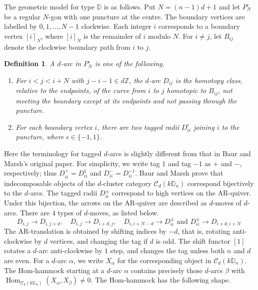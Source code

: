 \documentclass[12pt]{article}
\theoremstyle{plain}
\newtheorem{Def}{Definition}[section]
\theoremstyle{definition}
\DeclareMathOperator{\Hom}{Hom}
\begin{document}
The geometric model for type \(\mathbb D\) is as follows.  Put
\(N=(n-1)d+1\)
and let \(P_N^{\circ}\) be a regular \(N\)-gon with one puncture at the centre.
The boundary vertices are labelled by \(0,1,\ldots,N-1\) clockwise. Each integer $i$ corresponds to a boundary vertex $[i]_N$, where $[i]_N$ is the remainder of $i$ modulo $N$. For $i\neq j$, let \(B_{ij}\) denote the clockwise boundary path from \(i\) to \(j\).

\begin{Def}
A \(d\)-arc in \(P_N^{\circ}\) is one of the following. 
\begin{enumerate}
    \item For $i<j<i+N$ with $j-i-1\in d\mathbb{Z}$, the $d$-arc \(D_{ij}\) is the homotopy class, relative to the
endpoints, of the curve from \(i\) to \(j\) homotopic to \(B_{ij}\), not
meeting the boundary except at its endpoints and not passing through the
puncture.
\item For each boundary vertex \(i\), there are two tagged radii
\(D_{ii}^{\epsilon}\) joining \(i\) to the puncture, where $\epsilon\in\{-1,1\}$.
\end{enumerate}
\end{Def}
Here the terminology for tagged $d$-arcs is slightly different from that in Baur and Marsh's original paper. For simplicity, we write tag $1$ and tag $-1$ as $+$ and $-$, respectively; thus \(D_{ii}^{+}=D_{ii}^{1}\) and \(D_{ii}^{-}=D_{ii}^{-1}\).
Baur and Marsh prove that indecomposable objects of the $d$-cluster category $\mathcal{C}_d(k\mathbb{D}_n)$ correspond bijectively to the $d$-arcs. The tagged radii $D_{ii}^{\pm}$ correspond to high vertices on the AR-quiver. Under this bijection, the arrows on the AR-quiver are described as $d$-moves of $d$-arcs. There are $4$ types of $d$-moves, as listed below. 
\[D_{i,j}\rightarrow D_{i,j+d},\quad D_{i,j}\rightarrow D_{i+d,j},\quad D_{i,i+N-d}\rightarrow D_{ii}^{\pm} \mbox{ and }D_{ii}^{\pm}\rightarrow D_{i+d,i+N}\]
The AR-translation is obtained by shifting indices by $-d$, that is, rotating anti-clockwise by $d$ vertices, and changing the tag if $d$ is odd. The shift functor $[1]$ rotates a $d$-arc anti-clockwise by $1$ step, and changes the tag unless both $n$ and $d$ are even. For a $d$-arc $\alpha$, we write $X_{\alpha}$ for the corresponding object in $\mathcal{C}_d(k\mathbb{D}_n)$. The Hom-hammock starting at a $d$-arc $\alpha$ contains precisely those $d$-arcs $\beta$ with $\Hom_{\mathcal{C}_d(k\mathbb{D}_n)}(X_{\alpha},X_{\beta})\neq 0$. The Hom-hammock has the following shape. 
\end{document}
